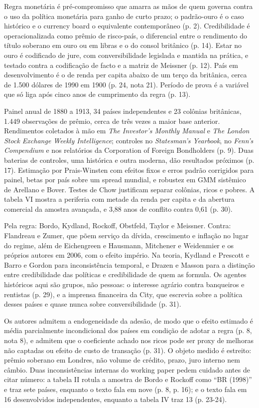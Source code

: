 Regra monetária é pré-compromisso que amarra as mãos de quem governa contra o uso
da política monetária para ganho de curto prazo; o padrão-ouro é o caso histórico
e o currency board o equivalente contemporâneo (p. 2). Credibilidade é
operacionalizada como prêmio de risco-país, o diferencial entre o rendimento do
título soberano em ouro ou em libras e o do consol britânico (p. 14). Estar no
ouro é codificado de jure, com conversibilidade legislada e mantida na prática, e
testado contra a codificação de facto e a matriz de Meissner (p. 12). País em
desenvolvimento é o de renda per capita abaixo de um terço da britânica, cerca de
1.500 dólares de 1990 em 1900 (p. 24, nota 21). Período de prova é a variável que
só liga após cinco anos de cumprimento da regra (p. 13).

Painel anual de 1880 a 1913, 34 países independentes e 23 colônias britânicas,
1.449 observações de prêmio, cerca de três vezes a maior base anterior.
Rendimentos coletados à mão em \textit{The Investor's Monthly Manual} e
\textit{The London Stock Exchange Weekly Intelligence}; controles no
\textit{Statesman's Yearbook}, no \textit{Fenn's Compendium} e nos relatórios da
Corporation of Foreign Bondholders (p. 9). Duas baterias de controles, uma
histórica e outra moderna, dão resultados próximos (p. 17). Estimação por
Prais-Winsten com efeitos fixos e erros padrão corrigidos para painel, betas por
país sobre um spread mundial, e robustez em GMM sistêmico de Arellano e Bover.
Testes de Chow justificam separar colônias, ricos e pobres. A tabela VI mostra a
periferia com metade da renda per capita e da abertura comercial da amostra
avançada, e 3,88 anos de conflito contra 0,61 (p. 30).

Pela regra: Bordo, Kydland, Rockoff, Obstfeld, Taylor e Meissner. Contra:
Flandreau e Zumer, que põem serviço da dívida, crescimento e inflação no lugar do
regime, além de Eichengreen e Hausmann, Mitchener e Weidenmier e os próprios
autores em 2006, com o efeito império. Na teoria, Kydland e Prescott e Barro e
Gordon para inconsistência temporal, e Drazen e Masson para a distinção entre
credibilidade das políticas e credibilidade de quem as formula. Os agentes
históricos aqui são grupos, não pessoas: o interesse agrário contra banqueiros e
rentistas (p. 29), e a imprensa financeira da City, que escrevia sobre a política
desses países e quase nunca sobre conversibilidade (p. 31).

Os autores admitem a endogeneidade da adesão, de modo que o efeito estimado é
média parcialmente incondicional dos países em condição de adotar a regra (p. 8,
nota 8), e admitem que o coeficiente achado nos ricos pode ser proxy de melhoras
não captadas ou efeito de custo de transação (p. 31). O objeto medido é estreito:
prêmio soberano em Londres, não volume de crédito, prazo, juro interno nem
câmbio. Duas inconsistências internas do working paper pedem cuidado antes de
citar número: a tabela II rotula a amostra de Bordo e Rockoff como ``BR (1998)''
e traz sete países, enquanto o texto fala em nove (p. 8, p. 16); e o texto fala em
16 desenvolvidos independentes, enquanto a tabela IV traz 13 (p. 23-24).

